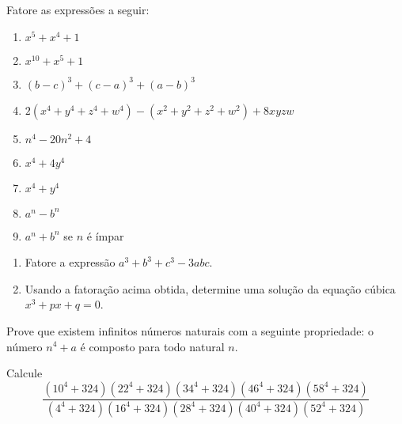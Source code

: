 \begin{questao}
  Fatore as expressões a seguir:

  \begin{enumerate}

  \item $x^5+x^4+1$

  \item $x^{10}+x^5+1$

  \item $(b-c)^3+(c-a)^3+(a-b)^3$

  \item $2(x^4+y^4+z^4+w^4) - (x^2+y^2+z^2+w^2) + 8xyzw$

  \item $n^4-20n^2+4$

  \item $x^4+4y^4$

  \item $x^4+y^4$

  \item $a^n-b^n$

  \item $a^n+b^n$ se $n$ é ímpar
  \end{enumerate}

\end{questao}

\begin{questao}

  \begin{enumerate}

  \item Fatore a expressão $a^3+b^3+c^3-3abc$.

  \item Usando a fatoração acima obtida, determine uma solução da equação cúbica
    $x^3+px+q = 0$.

  \end{enumerate}

\end{questao}

\begin{questao}
  Prove que existem infinitos números naturais com a seguinte propriedade: o
  número $n^4+a$ é composto para todo natural $n$.
\end{questao}

\begin{questao}
  Calcule
  $$ \frac{(10^4+324)(22^4+324)(34^4+324)(46^4+324)(58^4+324)}
  {(4^4+324)(16^4+324)(28^4+324)(40^4+324)(52^4+324)} $$
\end{questao}

